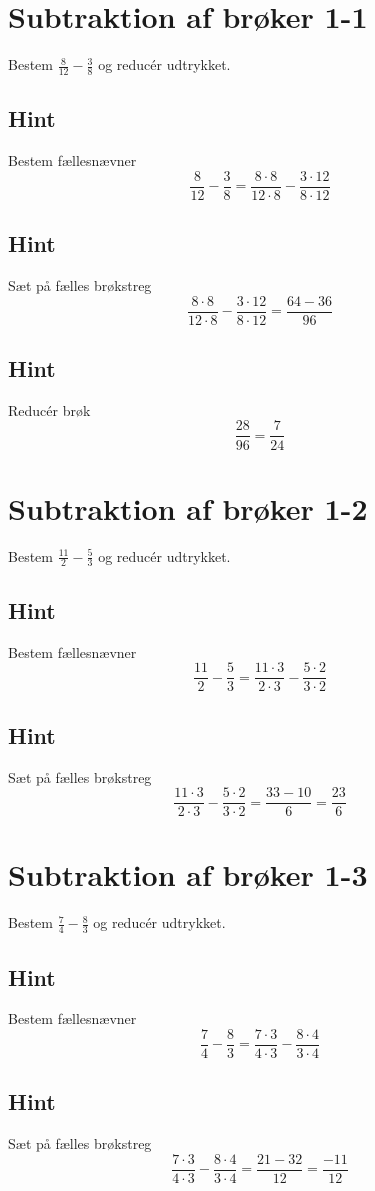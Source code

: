 \documentclass{article}
\newenvironment{exercise}[1]{\newpage\section{#1}}{}
\newcommand{\answerbox}[1]{\fbox{$#1$}}
\newcommand{\hint}{\subsection*{Hint}}
\begin{document}
	\tableofcontents
	\newpage
	
	\begin{exercise}{Subtraktion af brøker 1-1}
		
		Bestem $\frac{8}{12}-\frac{3}{8}$ og reducér udtrykket.
		
		\answerbox{\frac{7}{24}}
		
		\hint
		
		Bestem fællesnævner
		\[
		\frac{8}{12}-\frac{3}{8}  = \frac{8 \cdot 8}{12 \cdot 8}-\frac{3 \cdot 12}{8\cdot 12} 
		\]
		
		\hint
		
		Sæt på fælles brøkstreg
		\[
		\frac{8 \cdot 8}{12 \cdot 8}-\frac{3 \cdot 12}{8\cdot 12}    = \frac{64-36}{96} 
		\]
		
		\hint
		
		Reducér brøk
		\[
		\frac{28}{96} = \frac{7}{24}
		\]
		
	\end{exercise}
	
	\newpage
	
	\begin{exercise}{Subtraktion af brøker 1-2}
		
		Bestem $\frac{11}{2}-\frac{5}{3}$ og reducér udtrykket.
		
		\answerbox{\frac{23}{6}}
		
		\hint
		
		Bestem fællesnævner
		\[
		\frac{11}{2}-\frac{5}{3}  = \frac{11 \cdot 3}{2 \cdot 3}-\frac{5 \cdot 2}{3\cdot 2} 
		\]
		
		\hint
		
		Sæt på fælles brøkstreg
		\[
		\frac{11 \cdot 3}{2 \cdot 3}-\frac{5 \cdot 2}{3\cdot 2}    = \frac{33-10}{6}  = \frac{23}{6}
		\]
		
		
	\end{exercise}
	\newpage
	
	\begin{exercise}{Subtraktion af brøker 1-3}
		
		Bestem $\frac{7}{4}-\frac{8}{3}$ og reducér udtrykket.
		
		\answerbox{\frac{-11}{12}}
		
		\hint
		
		Bestem fællesnævner
		\[
		\frac{7}{4}-\frac{8}{3}  = \frac{7 \cdot 3}{4 \cdot 3}-\frac{8 \cdot 4}{3\cdot 4} 
		\]
		
		\hint
		
		Sæt på fælles brøkstreg
		\[
		\frac{7 \cdot 3}{4 \cdot 3}-\frac{8 \cdot 4}{3\cdot 4}    = \frac{21-32}{12}  = \frac{-11}{12}
		\]
		
		
	\end{exercise}
	
\end{document}
